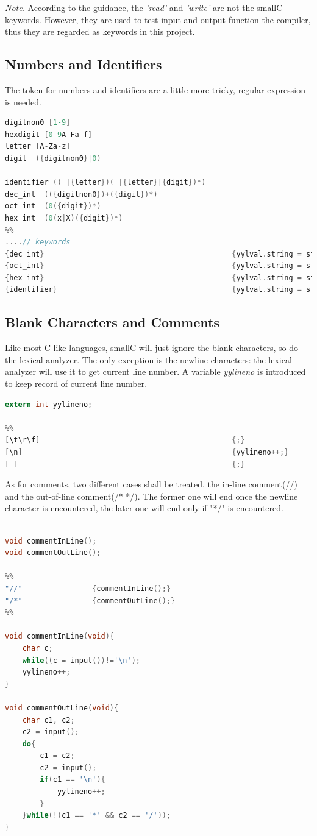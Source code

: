 \documentclass{article}
\begin{document}
\emph{Note.} According to the guidance, the \emph{'read'} and \emph{'write'} are not the smallC keywords. However, they are used to test input and output function the compiler, thus they are regarded as keywords in this project. 

\subsection{Numbers and Identifiers}
The token for numbers and identifiers are a little more tricky, regular expression is needed. 

\begin{lstlisting}[language = C] 
digitnon0 [1-9]
hexdigit [0-9A-Fa-f]
letter [A-Za-z]
digit  ({digitnon0}|0)

identifier ((_|{letter})(_|{letter}|{digit})*)
dec_int  (({digitnon0})+({digit})*)
oct_int  (0({digit})*)
hex_int  (0(x|X)({digit})*)
%%
....// keywords
{dec_int}											{yylval.string = strdup(yytext); return INT; }
{oct_int}											{yylval.string = strdup(yytext); return INT; }
{hex_int}											{yylval.string = strdup(yytext); return INT; }
{identifier}										{yylval.string = strdup(yytext); return ID;}
\end{lstlisting}

\subsection{Blank Characters and Comments}
Like most C-like languages, smallC will just ignore the blank characters, so do the lexical analyzer. The only exception is the newline characters: the lexical analyzer will use it to get current line number. A variable \textit{yylineno} is introduced to keep record of current line number. 

\begin{lstlisting}[language = C] 
extern int yylineno;

%%
[\t\r\f]											{;}
[\n]												{yylineno++;}
[ ]													{;}

\end{lstlisting}

As for comments, two different cases shall be treated, the in-line comment(//) and the out-of-line comment(/* */). The former one will end once the newline character is encountered, the later one will end only if "*/" is encountered. 

\begin{lstlisting}[language = C] 

void commentInLine();
void commentOutLine();

%%
"//"				{commentInLine();}
"/*"				{commentOutLine();}
%%

void commentInLine(void){
	char c;
	while((c = input())!='\n');
	yylineno++;
}

void commentOutLine(void){
	char c1, c2;
	c2 = input();
	do{
		c1 = c2;
		c2 = input();
		if(c1 == '\n'){
			yylineno++;		
		}
	}while(!(c1 == '*' && c2 == '/'));
}
\end{lstlisting}
\end{document}
